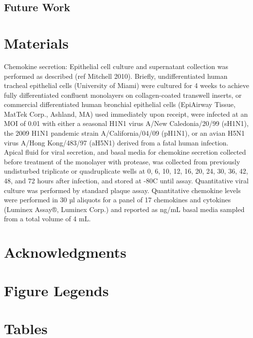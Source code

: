 \documentclass[10pt]{article}
\begin{document}
\subsection*{Future Work}



\section*{Materials}

Chemokine secretion:  Epithelial cell culture and supernatant collection was performed as described (ref Mitchell 2010).  Briefly, undifferentiated human tracheal epithelial cells (University of Miami) were cultured for 4 weeks to achieve fully differentiated confluent monolayers on collagen-coated transwell inserts, or commercial differentiated human bronchial epithelial cells (EpiAirway Tissue, MatTek Corp., Ashland, MA) used immediately upon receipt, were infected at an MOI of 0.01 with either a seasonal H1N1 virus A/New Caledonia/20/99 (sH1N1), the 2009 H1N1 pandemic strain A/California/04/09 (pH1N1), or an avian H5N1 virus A/Hong Kong/483/97 (aH5N1) derived from a fatal human infection.  Apical fluid for viral secretion, and basal media for chemokine secretion collected before treatment of the monolayer with protease, was collected from previously undisturbed triplicate or quadruplicate wells at 0, 6, 10, 12, 16, 20, 24, 30, 36, 42, 48, and 72 hours after infection, and stored at -80C until assay.  Quantitative viral culture was performed by standard plaque assay.  Quantitative chemokine levels were performed in 30 µl aliquots for a panel of 17 chemokines and cytokines (Luminex Assay®, Luminex Corp.) and reported as ng/mL basal media sampled from a total volume of 4 mL.

\section*{Acknowledgments}




\section*{Figure Legends}


\section*{Tables}
\end{document}
